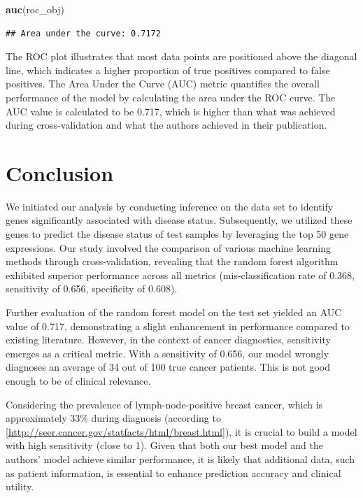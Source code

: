 \documentclass[
]{article}
\newenvironment{Shaded}{\begin{snugshade}}{\end{snugshade}}
\newcommand{\FunctionTok}[1]{\textcolor[rgb]{0.13,0.29,0.53}{\textbf{#1}}}
\newcommand{\NormalTok}[1]{#1}
\begin{document}
\begin{Shaded}
\begin{Highlighting}[]
\FunctionTok{auc}\NormalTok{(roc\_obj)}
\end{Highlighting}
\end{Shaded}

\begin{verbatim}
## Area under the curve: 0.7172
\end{verbatim}

The ROC plot illustrates that most data points are positioned above the
diagonal line, which indicates a higher proportion of true positives
compared to false positives. The Area Under the Curve (AUC) metric
quantifies the overall performance of the model by calculating the area
under the ROC curve. The AUC value is calculated to be 0.717, which is
higher than what was achieved during cross-validation and what the
authors achieved in their publication.

\hypertarget{conclusion}{%
\section{Conclusion}\label{conclusion}}

We initiated our analysis by conducting inference on the data set to
identify genes significantly associated with disease status.
Subsequently, we utilized these genes to predict the disease status of
test samples by leveraging the top 50 gene expressions. Our study
involved the comparison of various machine learning methods through
cross-validation, revealing that the random forest algorithm exhibited
superior performance across all metrics (mis-classification rate of
0.368, sensitivity of 0.656, specificity of 0.608).

Further evaluation of the random forest model on the test set yielded an
AUC value of 0.717, demonstrating a slight enhancement in performance
compared to existing literature. However, in the context of cancer
diagnostics, sensitivity emerges as a critical metric. With a
sensitivity of 0.656, our model wrongly diagnoses an average of 34 out
of 100 true cancer patients. This is not good enough to be of clinical
relevance.

Considering the prevalence of lymph-node-positive breast cancer, which
is approximately 33\% during diagnosis (according to
{[}\url{http://seer.cancer.gov/statfacts/html/breast.html}{]}), it is
crucial to build a model with high sensitivity (close to 1). Given that
both our best model and the authors' model achieve similar performance,
it is likely that additional data, such as patient information, is
essential to enhance prediction accuracy and clinical utility.
\end{document}

